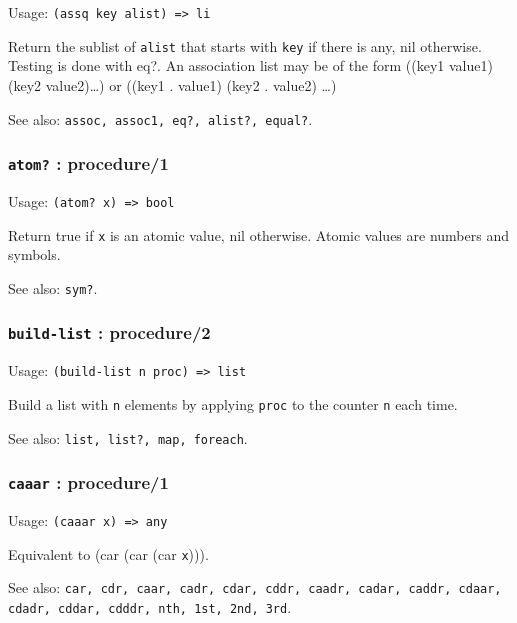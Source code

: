 \documentclass[
]{article}
\newcommand{\passthrough}[1]{#1}
\begin{document}
Usage: \passthrough{\lstinline!(assq key alist) => li!}

Return the sublist of \passthrough{\lstinline!alist!} that starts with
\passthrough{\lstinline!key!} if there is any, nil otherwise. Testing is
done with eq?. An association list may be of the form ((key1
value1)(key2 value2)\ldots) or ((key1 . value1) (key2 . value2) \ldots)

See also: \passthrough{\lstinline!assoc, assoc1, eq?, alist?, equal?!}.

\hypertarget{atom-procedure1}{%
\subsubsection{\texorpdfstring{\texttt{atom?} :
procedure/1}{atom? : procedure/1}}\label{atom-procedure1}}

Usage: \passthrough{\lstinline!(atom? x) => bool!}

Return true if \passthrough{\lstinline!x!} is an atomic value, nil
otherwise. Atomic values are numbers and symbols.

See also: \passthrough{\lstinline!sym?!}.

\hypertarget{build-list-procedure2}{%
\subsubsection{\texorpdfstring{\texttt{build-list} :
procedure/2}{build-list : procedure/2}}\label{build-list-procedure2}}

Usage: \passthrough{\lstinline!(build-list n proc) => list!}

Build a list with \passthrough{\lstinline!n!} elements by applying
\passthrough{\lstinline!proc!} to the counter
\passthrough{\lstinline!n!} each time.

See also: \passthrough{\lstinline!list, list?, map, foreach!}.

\hypertarget{caaar-procedure1}{%
\subsubsection{\texorpdfstring{\texttt{caaar} :
procedure/1}{caaar : procedure/1}}\label{caaar-procedure1}}

Usage: \passthrough{\lstinline!(caaar x) => any!}

Equivalent to (car (car (car \passthrough{\lstinline!x!}))).

See also:
\passthrough{\lstinline!car, cdr, caar, cadr, cdar, cddr, caadr, cadar, caddr, cdaar, cdadr, cddar, cdddr, nth, 1st, 2nd, 3rd!}.
\end{document}
